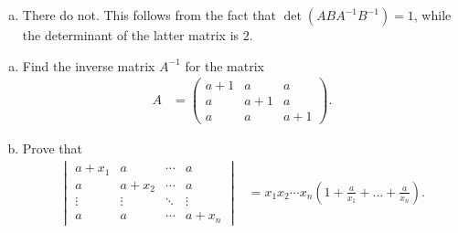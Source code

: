 \documentclass[10pt]{mypackage}
\begin{document}
\begin{solution}\hfill
  \begin{enumerate}[(a)]
    \item There do not. This follows from the fact that $\det\left( ABA^{-1}B^{-1} \right) = 1$, while the determinant of the latter matrix is $2$.
  \end{enumerate}
\end{solution}
\begin{problem}[Problem 5]\hfill
  \begin{enumerate}[(a)]
    \item Find the inverse matrix $A^{-1}$ for the matrix
      \begin{align*}
        A &= \begin{pmatrix}a+1 & a & a \\ a & a+1 & a \\ a & a & a+1\end{pmatrix}.
      \end{align*}
    \item Prove that
      \begin{align*}
        \begin{vmatrix}a + x_1 & a & \cdots & a \\ a & a + x_2 & \cdots & a \\ \vdots & \vdots & \ddots & \vdots \\ a & a & \cdots & a + x_n\end{vmatrix} &= x_1x_2\cdots x_n\left( 1 + \frac{a}{x_1} + \dots + \frac{a}{x_n} \right).
      \end{align*}
  \end{enumerate}
\end{problem}
\end{document}
